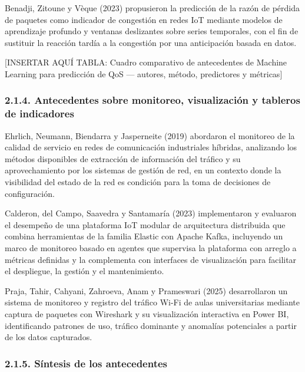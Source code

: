 \documentclass[
  12pt,
]{article}
\begin{document}
Benadji, Zitoune y Vèque (2023) propusieron la predicción de la razón de
pérdida de paquetes como indicador de congestión en redes IoT mediante
modelos de aprendizaje profundo y ventanas deslizantes sobre series
temporales, con el fin de sustituir la reacción tardía a la congestión
por una anticipación basada en datos.

{[}INSERTAR AQUÍ TABLA: Cuadro comparativo de antecedentes de Machine
Learning para predicción de QoS — autores, método, predictores y
métricas{]}

\subsubsection{2.1.4. Antecedentes sobre monitoreo, visualización y
tableros de
indicadores}\label{antecedentes-sobre-monitoreo-visualizaciuxf3n-y-tableros-de-indicadores}

Ehrlich, Neumann, Biendarra y Jasperneite (2019) abordaron el monitoreo
de la calidad de servicio en redes de comunicación industriales
híbridas, analizando los métodos disponibles de extracción de
información del tráfico y su aprovechamiento por los sistemas de gestión
de red, en un contexto donde la visibilidad del estado de la red es
condición para la toma de decisiones de configuración.

Calderon, del Campo, Saavedra y Santamaría (2023) implementaron y
evaluaron el desempeño de una plataforma IoT modular de arquitectura
distribuida que combina herramientas de la familia Elastic con Apache
Kafka, incluyendo un marco de monitoreo basado en agentes que supervisa
la plataforma con arreglo a métricas definidas y la complementa con
interfaces de visualización para facilitar el despliegue, la gestión y
el mantenimiento.

Praja, Tahir, Cahyani, Zahroeva, Anam y Prameswari (2025) desarrollaron
un sistema de monitoreo y registro del tráfico Wi-Fi de aulas
universitarias mediante captura de paquetes con Wireshark y su
visualización interactiva en Power BI, identificando patrones de uso,
tráfico dominante y anomalías potenciales a partir de los datos
capturados.

\subsubsection{2.1.5. Síntesis de los
antecedentes}\label{suxedntesis-de-los-antecedentes}
\end{document}
